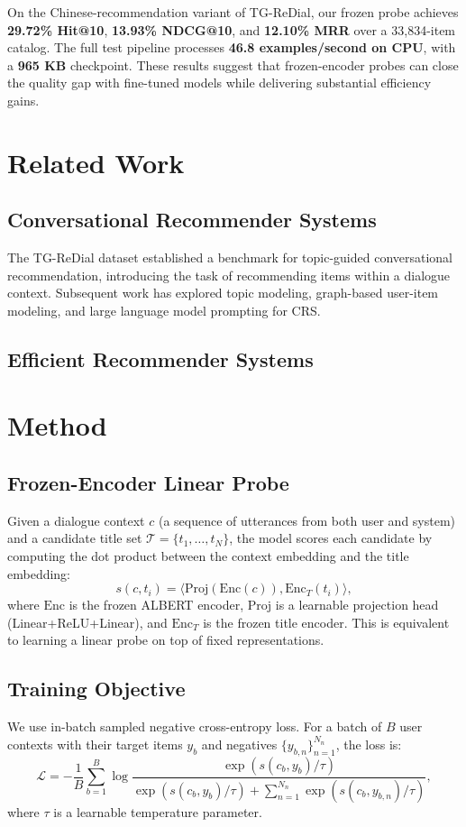 \documentclass[conference]{IEEEtran}
\begin{document}
On the Chinese-recommendation variant of TG-ReDial, our frozen probe
achieves \textbf{29.72\% Hit@10}, \textbf{13.93\% NDCG@10}, and \textbf{12.10\% MRR}
over a 33,834-item catalog. The full test pipeline processes
\textbf{46.8 examples/second on CPU}, with a \textbf{965 KB} checkpoint. These
results suggest that frozen-encoder probes can close the quality gap with
fine-tuned models while delivering substantial efficiency gains.

\section{Related Work}

\subsection{Conversational Recommender Systems}
The TG-ReDial dataset established a benchmark for topic-guided
conversational recommendation, introducing the task of recommending items
within a dialogue context. Subsequent work has explored topic modeling,
graph-based user-item modeling, and large language model prompting for CRS.

\subsection{Efficient Recommender Systems}
\section{Method}

\subsection{Frozen-Encoder Linear Probe}
Given a dialogue context $c$ (a sequence of utterances from both user and
system) and a candidate title set $\mathcal{T} = \{t_1, \dots, t_N\}$, the
model scores each candidate by computing the dot product between the
context embedding and the title embedding:
\begin{equation}
    s(c, t_i) = \langle \text{Proj}(\text{Enc}(c)), \text{Enc}_T(t_i) \rangle,
\end{equation}
where $\text{Enc}$ is the frozen ALBERT encoder, $\text{Proj}$ is a learnable
projection head (Linear+ReLU+Linear), and $\text{Enc}_T$ is the frozen title
encoder. This is equivalent to learning a linear probe on top of fixed
representations.

\subsection{Training Objective}
We use in-batch sampled negative cross-entropy loss. For a batch of $B$ user
contexts with their target items $y_b$ and negatives $\{y_{b,n}\}_{n=1}^{N_n}$,
the loss is:
\begin{equation}
    \mathcal{L} = -\frac{1}{B} \sum_{b=1}^{B} \log
    \frac{\exp(s(c_b, y_b) / \tau)}
    {\exp(s(c_b, y_b) / \tau) + \sum_{n=1}^{N_n} \exp(s(c_b, y_{b,n}) / \tau)},
\end{equation}
where $\tau$ is a learnable temperature parameter.
\end{document}

